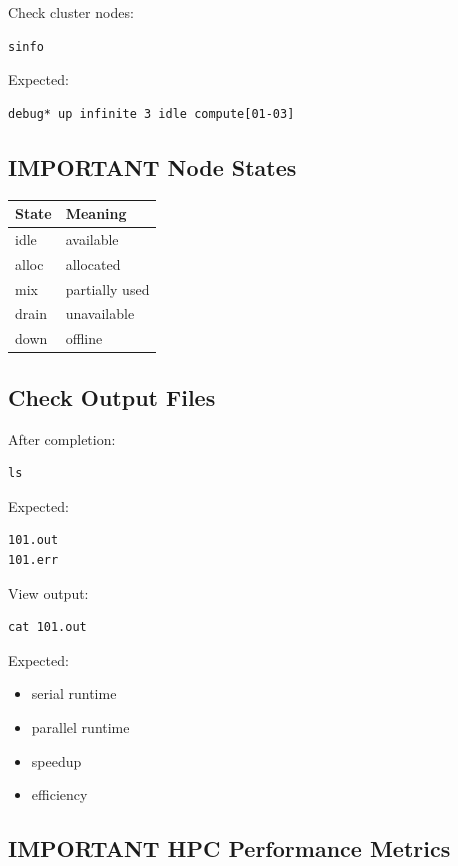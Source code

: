 \documentclass[11pt]{article}
\begin{document}
Check cluster nodes:

\begin{verbatim}
sinfo
\end{verbatim}

Expected:

\begin{verbatim}
debug* up infinite 3 idle compute[01-03]
\end{verbatim}
\subsection{IMPORTANT Node States}
\label{sec:orgf5a36c0}

\begin{center}
\begin{tabular}{ll}
State & Meaning\\
\hline
idle & available\\
alloc & allocated\\
mix & partially used\\
drain & unavailable\\
down & offline\\
\end{tabular}
\end{center}
\subsection{Check Output Files}
\label{sec:org6690567}

After completion:

\begin{verbatim}
ls
\end{verbatim}

Expected:

\begin{verbatim}
101.out
101.err
\end{verbatim}

View output:

\begin{verbatim}
cat 101.out
\end{verbatim}

Expected:

\begin{itemize}
\item serial runtime
\item parallel runtime
\item speedup
\item efficiency
\end{itemize}
\subsection{IMPORTANT HPC Performance Metrics}
\label{sec:orga0df434}
\end{document}
